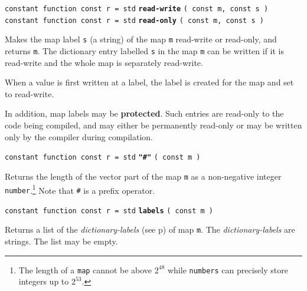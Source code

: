 \documentclass[12pt]{article}
\newcommand{\key}[1]{{\rm \bfseries #1}}
\newcommand{\ttkey}[1]{{\tt \bfseries #1}}
\newcommand{\pagref}[1]{p\pageref{#1}}
\newenvironment{indpar}[1][0.3in]%
	{\begin{list}{}%
		     {\setlength{\itemsep}{0in}%
		      \setlength{\topsep}{0in}%
		      \setlength{\parsep}{1ex}%
		      \setlength{\labelwidth}{#1}%
		      \setlength{\leftmargin}{#1}%
		      \addtolength{\leftmargin}{\labelsep}}%
	 \item}%
	{\end{list}}
\begin{document}
{\tt constant function const r = std} \ttkey{read-write}
                                      {\tt ( const m, const s )} \\
{\tt constant function const r = std} \ttkey{read-only}
                                      {\tt ( const m, const s )} %
\label{READ-ONLY-DICTIONARY-FUNCTION}
\begin{indpar}
Makes the map label {\tt s} (a string) of the map {\tt m}
read-write or read-only, and returns {\tt m}.  The dictionary entry
labelled {\tt s} in the map {\tt m} can be written if it is
read-write and the whole map is separately read-write.

When a value is first written at a label, the label is created
for the map and set to read-write.

In addition, map labels may be \key{protected}.  Such entries
are read-only to the code being compiled, and may either be
permanently read-only or may be written only by the compiler
during compilation.
\end{indpar}

{\tt constant function const r = std} \ttkey{"\#"} {\tt ( const m )}
\begin{indpar}
Returns the length of the vector part of the map {\tt m}
as a non-negative integer
{\tt number}.\footnote{The length of a {\tt map} cannot
be above $2^{48}$ while
{\tt numbers} can precisely store integers up to $2^{53}$.}
Note that {\tt \#} is a prefix operator.
\end{indpar}

{\tt constant function const r = std} \ttkey{labels} {\tt ( const m )}
\begin{indpar}
Returns a list of the {\em dictionary-labels}
(see \pagref{DICTIONARY-LABEL}) of map {\tt m}.
The {\em dictionary-labels} are strings.  The list may be empty.
\end{indpar}
\end{document}
